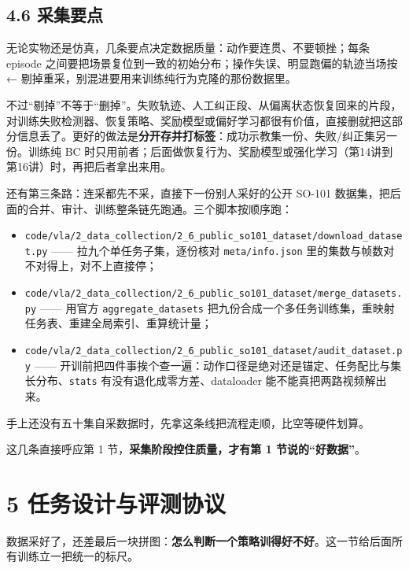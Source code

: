 \documentclass[
  chinese,
]{ctexart}
\providecommand{\tightlist}{%
  \setlength{\itemsep}{0pt}\setlength{\parskip}{0pt}}
\begin{document}
\subsection{4.6 采集要点}\label{ux91c7ux96c6ux8981ux70b9}

无论实物还是仿真，几条要点决定数据质量：动作要连贯、不要顿挫；每条
episode 之间要把场景复位到一致的初始分布；操作失误、明显跑偏的轨迹当场按
← 剔掉重采，别混进要用来训练纯行为克隆的那份数据里。

不过``剔掉''不等于``删掉''。失败轨迹、人工纠正段、从偏离状态恢复回来的片段，对训练失败检测器、恢复策略、奖励模型或偏好学习都很有价值，直接删就把这部分信息丢了。更好的做法是\textbf{分开存并打标签}：成功示教集一份、失败/纠正集另一份。训练纯
BC
时只用前者；后面做恢复行为、奖励模型或强化学习（第14讲到第16讲）时，再把后者拿出来用。

还有第三条路：连采都先不采，直接下一份别人采好的公开 SO-101
数据集，把后面的合并、审计、训练整条链先跑通。三个脚本按顺序跑：

\begin{itemize}
\tightlist
\item
  \texttt{code/vla/2\_data\_collection/2\_6\_public\_so101\_dataset/download\_dataset.py}
  ------ 拉九个单任务子集，逐份核对 \texttt{meta/info.json}
  里的集数与帧数对不对得上，对不上直接停；
\item
  \texttt{code/vla/2\_data\_collection/2\_6\_public\_so101\_dataset/merge\_datasets.py}
  ------ 用官方 \texttt{aggregate\_datasets}
  把九份合成一个多任务训练集，重映射任务表、重建全局索引、重算统计量；
\item
  \texttt{code/vla/2\_data\_collection/2\_6\_public\_so101\_dataset/audit\_dataset.py}
  ------
  开训前把四件事挨个查一遍：动作口径是绝对还是锚定、任务配比与集长分布、\texttt{stats}
  有没有退化成零方差、dataloader 能不能真把两路视频解出来。
\end{itemize}

手上还没有五十集自采数据时，先拿这条线把流程走顺，比空等硬件划算。

这几条直接呼应第 1 节，\textbf{采集阶段控住质量，才有第 1
节说的``好数据''}。

\section{5
任务设计与评测协议}\label{ux4efbux52a1ux8bbeux8ba1ux4e0eux8bc4ux6d4bux534fux8bae}

数据采好了，还差最后一块拼图：\textbf{怎么判断一个策略训得好不好}。这一节给后面所有训练立一把统一的标尺。
\end{document}
